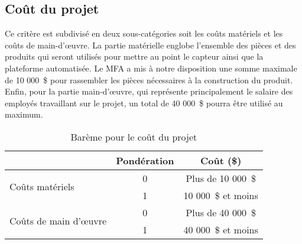 

\subsection{Coût du projet}
\label{s:cdc_cee_coutproj}

Ce critère est subdivisé en deux sous-catégories soit les coûts matériels et les coûts de main-d’œuvre.
La partie matérielle englobe l’ensemble des pièces et des produits qui seront utilisés pour mettre au point le capteur ainsi que la plateforme automatisée.
Le MFA a mis à notre disposition une somme maximale de 10 000~\$ pour rassembler les pièces nécessaires à la construction du produit.
Enfin, pour la partie main-d’œuvre, qui représente principalement le salaire des employés travaillant sur le projet, un total de 40 000~\$ pourra être utilisé au maximum.

\begin{table}[htp]
	\caption{Barème pour le coût du projet}
	\label{tab:cdc_cee_coutproj}
	\centering
	\begin{tabular}{|l|c|c|}
		\hline
		& Pondération & Coût (\$)         \\ \hline
		\multirow{2}{*}{Coûts matériels}       & 0           & Plus de 10 000~\$  \\ \cline{2-3} 
		& 1           & 10 000~\$ et moins \\ \hline
		\multirow{2}{*}{Coûts de main d’œuvre} & 0           & Plus de 40 000~\$  \\ \cline{2-3} 
		& 1           & 40 000~\$ et moins \\ \hline
	\end{tabular}
\end{table}